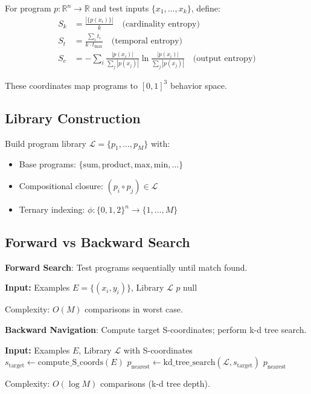 \documentclass[twocolumn,aps,prl,superscriptaddress,floatfix]{revtex4-2}
\begin{document}
For program $p: \mathbb{R}^n \to \mathbb{R}$ and test inputs $\{x_1, \ldots, x_k\}$, define:
\begin{align}
S_k &= \frac{|\{p(x_i)\}|}{k} \quad \text{(cardinality entropy)} \\
S_t &= \frac{\sum_i t_i}{k \cdot t_{\max}} \quad \text{(temporal entropy)} \\
S_e &= -\sum_i \frac{|p(x_i)|}{\sum_j |p(x_j)|} \ln \frac{|p(x_i)|}{\sum_j |p(x_j)|} \quad \text{(output entropy)}
\end{align}

These coordinates map programs to $[0,1]^3$ behavior space.

\subsection{Library Construction}

Build program library $\mathcal{L} = \{p_1, \ldots, p_M\}$ with:
\begin{itemize}
\item Base programs: $\{\text{sum}, \text{product}, \text{max}, \text{min}, \ldots\}$
\item Compositional closure: $(p_i \circ p_j) \in \mathcal{L}$
\item Ternary indexing: $\phi: \{0,1,2\}^n \to \{1, \ldots, M\}$
\end{itemize}

\subsection{Forward vs Backward Search}

\textbf{Forward Search}: Test programs sequentially until match found.
\begin{algorithmic}
\STATE \textbf{Input:} Examples $E = \{(x_i, y_i)\}$, Library $\mathcal{L}$
        \RETURN $p$
    \ENDIF
\ENDFOR
\RETURN null
\end{algorithmic}
Complexity: $O(M)$ comparisons in worst case.

\textbf{Backward Navigation}: Compute target S-coordinates; perform k-d tree search.
\begin{algorithmic}
\STATE \textbf{Input:} Examples $E$, Library $\mathcal{L}$ with S-coordinates
\STATE $s_{\text{target}} \gets \text{compute\_S\_coords}(E)$
\STATE $p_{\text{nearest}} \gets \text{kd\_tree\_search}(\mathcal{L}, s_{\text{target}})$
\RETURN $p_{\text{nearest}}$
\end{algorithmic}
Complexity: $O(\log M)$ comparisons (k-d tree depth).
\end{document}
